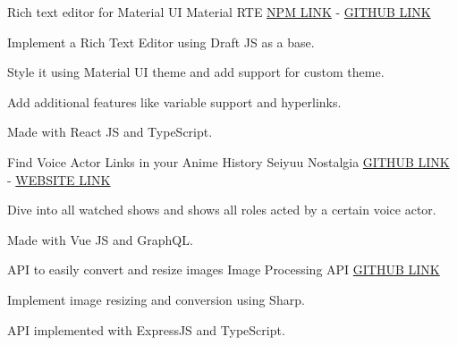 


\begin{cventries}



\cventry
{Rich text editor for Material UI} %
{Material RTE} %
{\href{https://www.npmjs.com/package/material-rte}{\color{awesome-skyblue}NPM LINK} - \href{https://github.com/Ali60351/material-rte}{\color{awesome-skyblue}GITHUB LINK}} %
{} %
{ %
\begin{cvitems}
\item {Implement a Rich Text Editor using Draft JS as a base.}
\item {Style it using Material UI theme and add support for custom theme.}
\item {Add additional features like variable support and hyperlinks.}
\item {Made with React JS and TypeScript.}
\end{cvitems}
}


\cventry
{Find Voice Actor Links in your Anime History} %
{Seiyuu Nostalgia} %
{\href{https://github.com/Ali60351/seiyuu-nostalgia}{\color{awesome-skyblue}GITHUB LINK} - \href{https://ali60351.github.io/seiyuu-nostalgia/}{\color{awesome-skyblue}WEBSITE LINK}} %
{} %
{ %
\begin{cvitems}
\item {Dive into all watched shows and shows all roles acted by a certain voice actor.}
\item {Made with Vue JS and GraphQL.}
\end{cvitems}
}


\cventry
{API to easily convert and resize images} %
{Image Processing API} %
{\href{https://github.com/Ali60351/image-processing-api}{\color{awesome-skyblue}GITHUB LINK}} %
{} %
{ %
\begin{cvitems}
\item {Implement image resizing and conversion using Sharp.}
\item {API implemented with ExpressJS and TypeScript.}
\end{cvitems}
}


\end{cventries}
